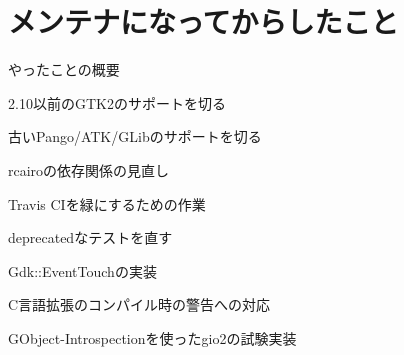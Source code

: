 \section{メンテナになってからしたこと}

\begin{frame}
\begin{block}{やったことの概要}
\begin{itemize}
{\Large
\item 2.10以前のGTK2のサポートを切る
\item 古いPango/ATK/GLibのサポートを切る
\item rcairoの依存関係の見直し
\item Travis CIを緑にするための作業
\item deprecatedなテストを直す
\item Gdk::EventTouchの実装
\item C言語拡張のコンパイル時の警告への対応
\item GObject-Introspectionを使ったgio2の試験実装
}
\end{itemize}
\end{block}
\end{frame}
